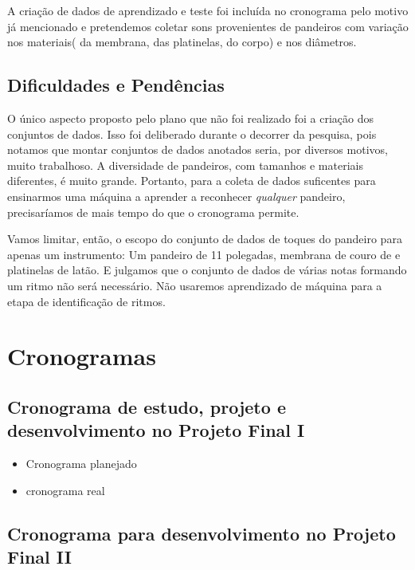 \documentclass[
  dissertacao,
  brazil
]{ThesisPUC}
\begin{document}
A criação de dados de aprendizado e teste foi incluída no cronograma pelo motivo já mencionado e pretendemos coletar sons provenientes de pandeiros com variação nos materiais( da membrana, das platinelas, do corpo) e nos diâmetros.


\section{Dificuldades e Pendências}

O único aspecto proposto pelo plano que não foi realizado foi a criação dos conjuntos de dados.
Isso foi deliberado durante o decorrer da pesquisa, pois notamos que montar conjuntos de dados anotados seria, por diversos motivos, muito trabalhoso.
A diversidade de pandeiros, com tamanhos e materiais diferentes, é muito grande. 
Portanto, para a coleta de dados suficentes para ensinarmos uma máquina a aprender a reconhecer \emph{qualquer} pandeiro, precisaríamos de mais tempo do que o cronograma permite. 

Vamos limitar, então, o escopo do conjunto de dados de toques do pandeiro para apenas um instrumento: Um pandeiro de 11 polegadas, membrana de couro de  e platinelas de latão.
E julgamos que o conjunto de dados de várias notas formando um ritmo não será necessário. Não usaremos aprendizado de máquina para a etapa de identificação de ritmos.


\chapter{Cronogramas}
\section{Cronograma de estudo, projeto e desenvolvimento no Projeto Final I}
\begin{itemize}
    \item Cronograma planejado
    
    \item cronograma real
\end{itemize}
\section{Cronograma para desenvolvimento no Projeto Final II}


\arial

\normalfont
\end{document}
